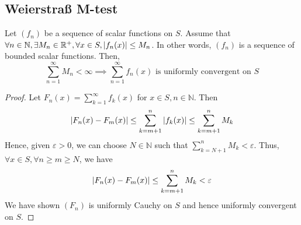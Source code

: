 \subsection{Weierstra\ss{} M-test}
\begin{theorem}
	Let \( (f_n) \) be a sequence of scalar functions on \( S \).
	Assume that \( \forall n \in \mathbb N, \exists M_n \in \mathbb R^+, \forall x \in S, \abs{f_n(x)} \leq M_n \).
	In other words, \( (f_n) \) is a sequence of bounded scalar functions.
	Then,
	\[
		\sum_{n = 1}^\infty M_n < \infty \implies \sum_{n=1}^\infty f_n(x) \text{ is uniformly convergent on } S
	\]
\end{theorem}
\begin{proof}
	Let \( F_n(x) = \sum_{k=1}^\infty f_k(x) \) for \( x \in S, n \in \mathbb N \).
	Then
	\[
		\abs{F_n(x) - F_m(x)} \leq \sum_{k=m+1}^n \abs{f_k(x)} \leq \sum_{k=m+1}^n M_k
	\]
	Hence, given \( \varepsilon > 0 \), we can choose \( N \in \mathbb N \) such that \( \sum_{k=N+1}^n M_k < \varepsilon \).
	Thus, \( \forall x \in S, \forall n \geq m \geq N \), we have
	\[
		\abs{F_n(x) - F_m(x)} \leq \sum_{k=m+1}^n M_k < \varepsilon
	\]
	We have shown \( (F_n) \) is uniformly Cauchy on \( S \) and hence uniformly convergent on \( S \).
\end{proof}


